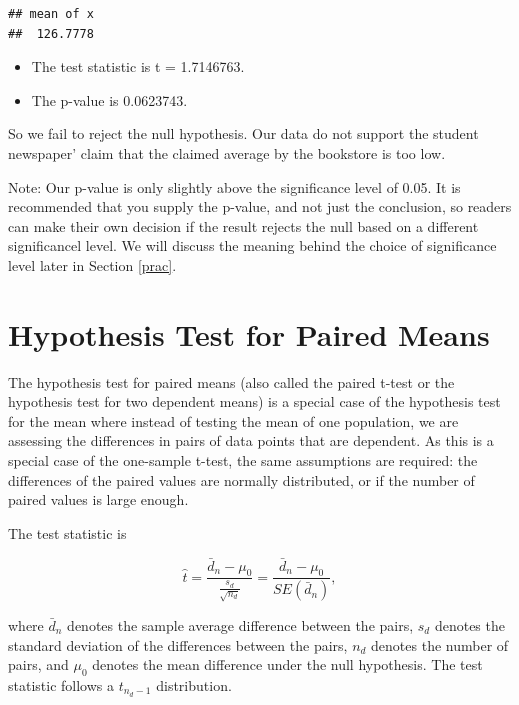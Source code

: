 \documentclass[
]{book}
\providecommand{\tightlist}{%
  \setlength{\itemsep}{0pt}\setlength{\parskip}{0pt}}
\theoremstyle{definition}
\theoremstyle{definition}
\theoremstyle{definition}
\theoremstyle{definition}
\theoremstyle{remark}
\begin{document}
\begin{verbatim}
## mean of x 
##  126.7778
\end{verbatim}

\begin{itemize}
\tightlist
\item
  The test statistic is t = 1.7146763.
\item
  The p-value is 0.0623743.
\end{itemize}

So we fail to reject the null hypothesis. Our data do not support the student newspaper' claim that the claimed average by the bookstore is too low.

Note: Our p-value is only slightly above the significance level of 0.05. It is recommended that you supply the p-value, and not just the conclusion, so readers can make their own decision if the result rejects the null based on a different significancel level. We will discuss the meaning behind the choice of significance level later in Section \ref{prac}.

\hypertarget{pairedt}{%
\section{Hypothesis Test for Paired Means}\label{pairedt}}

The hypothesis test for paired means (also called the paired t-test or the hypothesis test for two dependent means) is a special case of the hypothesis test for the mean where instead of testing the mean of one population, we are assessing the differences in pairs of data points that are dependent. As this is a special case of the one-sample t-test, the same assumptions are required: the differences of the paired values are normally distributed, or if the number of paired values is large enough.

The test statistic is

\begin{equation} 
\hat{t} =  \frac{\bar{d}_n - \mu_0}{\frac{s_d}{\sqrt{n_d}}} = \frac{\bar{d}_n - \mu_0}{SE(\bar{d}_n)},
\label{eq:9-teststatPaired}
\end{equation}

where \(\bar{d}_n\) denotes the sample average difference between the pairs, \(s_d\) denotes the standard deviation of the differences between the pairs, \(n_d\) denotes the number of pairs, and \(\mu_0\) denotes the mean difference under the null hypothesis. The test statistic follows a \(t_{n_d - 1}\) distribution.
\end{document}
